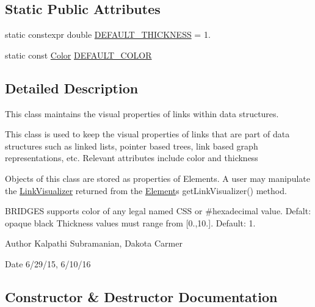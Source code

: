 \subsection*{Static Public Attributes}
\begin{DoxyCompactItemize}
\item 
static constexpr double \hyperlink{classbridges_1_1_link_visualizer_ab790c33080c769008114db34d5ec8950}{D\+E\+F\+A\+U\+L\+T\+\_\+\+T\+H\+I\+C\+K\+N\+E\+S\+S} = 1.
\item 
static const \hyperlink{classbridges_1_1_color}{Color} \hyperlink{classbridges_1_1_link_visualizer_a7698ad5b243041377d81152a339d1282}{D\+E\+F\+A\+U\+L\+T\+\_\+\+C\+O\+L\+O\+R}
\end{DoxyCompactItemize}


\subsection{Detailed Description}
This class maintains the visual properties of links within data structures. 

This class is used to keep the visual properties of links that are part of data structures such as linked lists, pointer based trees, link based graph representations, etc. Relevant attributes include color and thickness

Objects of this class are stored as properties of Elements. A user may manipulate the \hyperlink{classbridges_1_1_link_visualizer}{Link\+Visualizer} returned from the \hyperlink{classbridges_1_1_element}{Element}\textquotesingle{}s get\+Link\+Visualizer() method.

B\+R\+I\+D\+G\+E\+S supports color of any legal named C\+S\+S or \#hexadecimal value. Defalt\+: opaque black Thickness values must range from \mbox{[}0.,10.\mbox{]}. Default\+: 1.

\begin{DoxyAuthor}{Author}
Kalpathi Subramanian, Dakota Carmer 
\end{DoxyAuthor}
\begin{DoxyDate}{Date}
6/29/15, 6/10/16 
\end{DoxyDate}


\subsection{Constructor \& Destructor Documentation}
\hypertarget{classbridges_1_1_link_visualizer_aeb26445f5823fe1ccee1c2dd9c27fb90}{}
